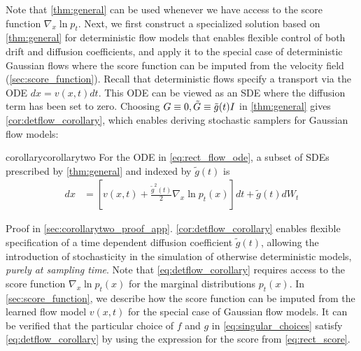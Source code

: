 Note that \cref{thm:general} can be used whenever we have access to the score function $\nabla_x \ln p_t$.
Next, we first construct a specialized solution based on \cref{thm:general} for deterministic flow models that enables flexible control of both drift and diffusion coefficients, and apply it to the special case of deterministic Gaussian flows where the score function can be imputed from the velocity field (\cref{sec:score_function}).
Recall that deterministic flows specify a transport via the ODE $dx = v(x, t)dt$.
This ODE can be viewed as an SDE where the diffusion term has been set to zero.
Choosing $G \equiv 0, \tilde G \equiv \tilde g(t)I$ in \cref{thm:general} gives \cref{cor:detflow_corollary}, which enables deriving stochastic samplers for Gaussian flow models:
\begin{restatable}{corollary}{corollarytwo}
\label{cor:detflow_corollary}
For the ODE in \cref{eq:rect_flow_ode}, a subset of SDEs prescribed by \cref{thm:general} and indexed by $\tilde g(t)$ is
\begin{align}
\label{eq:detflow_corollary}
dx &= \left[v(x, t) + \frac{\tilde g^2(t)}{2}\nabla_x \ln p_t(x)\right]dt + \tilde g(t) dW_t
\end{align}
\end{restatable}
Proof in \cref{sec:corollarytwo_proof_app}.
\cref{cor:detflow_corollary} enables flexible specification of a time dependent diffusion coefficient $\tilde g(t)$, allowing the introduction of stochasticity in the simulation of otherwise deterministic models, \emph{purely at sampling time}.
Note that \cref{eq:detflow_corollary} requires access to the score function $\nabla_x \ln p_t(x)$ for the marginal distributions $p_t(x)$.  In \cref{sec:score_function}, we describe how the score function can be imputed from the learned flow model $v(x, t)$ for the special case of Gaussian flow models.
It can be verified that the particular choice of $f$ and $g$ in \cref{eq:singular_choices}  satisfy \cref{eq:detflow_corollary} by using the expression for the score from \cref{eq:rect_score}.

